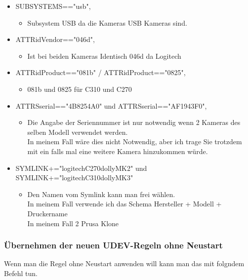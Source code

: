 \begin{itemize}
  \item SUBSYSTEMS=="{}usb",
    \begin{itemize}
      \item Subsystem USB da die Kameras USB Kameras sind.
    \end{itemize}
  \item ATTR{idVendor}=="046d",
    \begin{itemize}
      \item Ist bei beiden Kameras Identisch 046d da Logitech
    \end{itemize}
  \item ATTR{idProduct}=="081b" / ATTR{idProduct}=="0825",
  \begin{itemize}
    \item 081b und 0825 für C310 und C270
  \end{itemize}
  \item ATTRS{serial}=="4B8254A0" und ATTRS{serial}=="AF1943F0",
  \begin{itemize}
    \item Die Angabe der Seriennummer ist nur notwendig wenn 2 Kameras des selben Modell verwendet werden. \\ In meinem Fall wäre dies nicht Notwendig, aber ich trage Sie trotzdem mit ein falls mal eine weitere Kamera hinzukommen würde.
  \end{itemize}
  \item SYMLINK+="logitechC270dollyMK2" und SYMLINK+="logitechC310dollyMK3"
  \begin{itemize}
    \item Den Namen vom Symlink kann man frei wählen. \\In meinem Fall verwende ich das Schema Hersteller + Modell + Druckername \\ In meinem Fall 2 Prusa Klone
  \end{itemize}
\end{itemize}

\subsubsection{Übernehmen der neuen UDEV-Regeln ohne Neustart}
Wenn man die Regel ohne Neustart anwenden will kann man das mit folgndem Befehl tun.

\newpage
